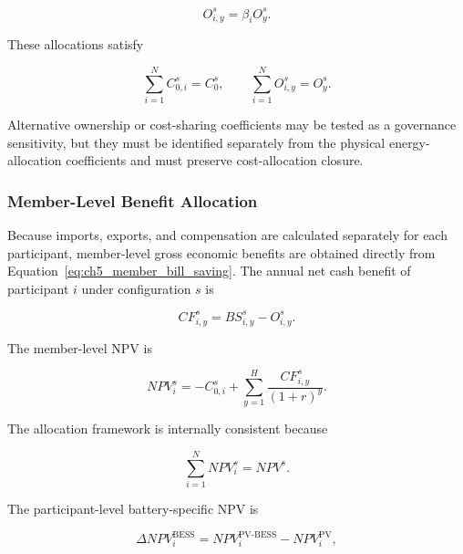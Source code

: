 \begin{equation}
O_{i,y}^{s}=\beta_i O_y^{s}.
\label{eq:ch5_member_opex_share}
\end{equation}

These allocations satisfy

\begin{equation}
\sum_{i=1}^{N}C_{0,i}^{s}=C_0^{s},
\qquad
\sum_{i=1}^{N}O_{i,y}^{s}=O_y^{s}.
\label{eq:ch5_cost_allocation_closure}
\end{equation}

Alternative ownership or cost-sharing coefficients may be tested as a governance sensitivity, but they must be identified separately from the physical energy-allocation coefficients and must preserve cost-allocation closure.

\subsubsection{Member-Level Benefit Allocation}
\label{sec:ch5_member_benefit_allocation}

Because imports, exports, and compensation are calculated separately for each participant, member-level gross economic benefits are obtained directly from Equation~\eqref{eq:ch5_member_bill_saving}. The annual net cash benefit of participant $i$ under configuration $s$ is

\begin{equation}
CF_{i,y}^{s}=BS_{i,y}^{s}-O_{i,y}^{s}.
\label{eq:ch5_member_cash_flow}
\end{equation}

The member-level NPV is

\begin{equation}
NPV_i^{s}=-C_{0,i}^{s}
+\sum_{y=1}^{H}\frac{CF_{i,y}^{s}}{(1+r)^y}.
\label{eq:ch5_member_npv}
\end{equation}

The allocation framework is internally consistent because

\begin{equation}
\sum_{i=1}^{N}NPV_i^{s}=NPV^{s}.
\label{eq:ch5_member_npv_closure}
\end{equation}

The participant-level battery-specific NPV is

\begin{equation}
\Delta NPV_i^{\mathrm{BESS}}
=NPV_i^{\mathrm{PV\mbox{-}BESS}}-NPV_i^{\mathrm{PV}},
\label{eq:ch5_member_incremental_bess_npv}
\end{equation}

